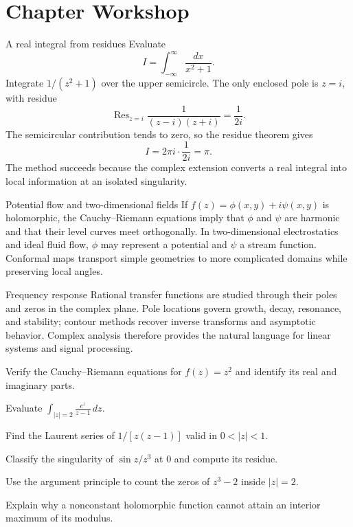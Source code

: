 \section{Chapter Workshop}

\begin{workedexample}{A real integral from residues}
Evaluate
\[
    I=\int_{-\infty}^{\infty}\frac{dx}{x^2+1}.
\]
Integrate $1/(z^2+1)$ over the upper semicircle. The only enclosed pole is $z=i$, with residue
\[
    \operatorname{Res}_{z=i}\frac1{(z-i)(z+i)}=\frac1{2i}.
\]
The semicircular contribution tends to zero, so the residue theorem gives
\[
    I=2\pi i\cdot\frac1{2i}=\pi.
\]
The method succeeds because the complex extension converts a real integral into local information at an isolated singularity.
\end{workedexample}

\begin{applicationbox}{Potential flow and two-dimensional fields}
If $f(z)=\phi(x,y)+i\psi(x,y)$ is holomorphic, the Cauchy--Riemann equations imply that $\phi$ and $\psi$ are harmonic and that their level curves meet orthogonally. In two-dimensional electrostatics and ideal fluid flow, $\phi$ may represent a potential and $\psi$ a stream function. Conformal maps transport simple geometries to more complicated domains while preserving local angles.
\end{applicationbox}

\begin{applicationbox}{Frequency response}
Rational transfer functions are studied through their poles and zeros in the complex plane. Pole locations govern growth, decay, resonance, and stability; contour methods recover inverse transforms and asymptotic behavior. Complex analysis therefore provides the natural language for linear systems and signal processing.
\end{applicationbox}

\begin{chapterexercises}
    \item Verify the Cauchy--Riemann equations for $f(z)=z^2$ and identify its real and imaginary parts.
    \item Evaluate $\int_{|z|=2}\frac{e^z}{z-1}\,dz$.
    \item Find the Laurent series of $1/[z(z-1)]$ valid in $0<|z|<1$.
    \item Classify the singularity of $\sin z/z^3$ at $0$ and compute its residue.
    \item Use the argument principle to count the zeros of $z^3-2$ inside $|z|=2$.
    \item Explain why a nonconstant holomorphic function cannot attain an interior maximum of its modulus.
\end{chapterexercises}

